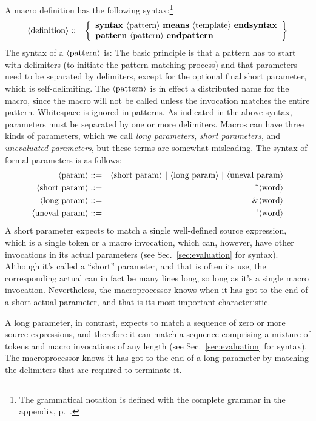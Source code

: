 \documentclass[12pt]{article}
\begin{document}
A macro definition has the following syntax:\footnote{
The grammatical notation is defined with the complete grammar in the appendix, p.\ \pageref{sec:grammar}.
}
\[ \nterm{definition} ::= \Alt
    \word{syntax}\ \nterm{pattern}\ \word{means}\ \nterm{template}\ \word{endsyntax}\\
    \word{pattern}\ \nterm{pattern}\ \word{endpattern}
  \Endalt
\]
The syntax of a $\langle\mbox{pattern}\rangle$ is:
The basic principle is that a pattern has to start with delimiters (to initiate the pattern matching process) and that parameters need to be separated by delimiters, except for the optional final short parameter, which is self-delimiting.
The $\langle\mbox{pattern}\rangle$ is in effect a distributed name for the macro, since the macro will not be called unless the invocation matches the entire pattern.
Whitespace is ignored in patterns.
As indicated in the above syntax, parameters must be separated by one or more delimiters.
Macros can have three kinds of parameters, which we call \emph{long parameters}, \emph{short parameters}, and \emph{unevaluated parameters}, but these terms are somewhat misleading.
The syntax of formal parameters is as follows:
\begin{eqnarray*}
\nterm{param} &::=& \nterm{short\ param}\ |\ \nterm{long\ param}\ |\ \nterm{uneval\ param}\\
\nterm{short\ param} &::=& \Tilde\nterm{word} \\
\nterm{long\ param} &::=& \&\nterm{word} \\
\nterm{uneval\ param} &::=& \mbox{'}\nterm{word}
\end{eqnarray*}
A short parameter expects to match a single well-defined source expression, which is a single token or a macro invocation, which can, however, have other invocations in its actual parameters
(see Sec.\ \ref{sec:evaluation} for syntax).
Although it's called a ``short'' parameter, and that is often its use, the corresponding actual can in fact be many lines long, so long as it's a single macro invocation.
Nevertheless, the macroprocessor knows when it has got to the end of a short actual parameter, and that is its most important characteristic.

A long parameter, in contrast, expects to match a sequence of zero or more source expressions, and therefore it can match a sequence comprising a mixture of tokens and macro invocations of any length
(see Sec.\ \ref{sec:evaluation} for syntax).
The macroprocessor knows it has got to the end of a long parameter by matching the delimiters that are required to terminate it.
\end{document}
